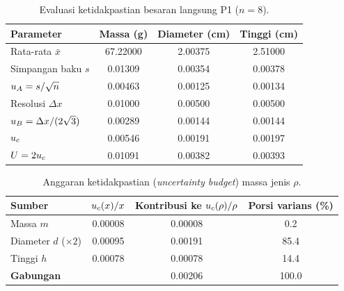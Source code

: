 \documentclass[a4paper, 12pt]{article}
\begin{document}
\begin{table}[H]
\centering
\singlespacing
\caption{Evaluasi ketidakpastian besaran langsung P1 ($n=8$).}
\label{tab:uP1}
\small
\begin{tabular}{l S[table-format=2.5] S[table-format=1.5] S[table-format=1.5]}
\toprule
\textbf{Parameter} & {Massa (g)} & {Diameter (cm)} & {Tinggi (cm)}\\
\midrule
Rata-rata $\bar{x}$ & 67.22000 & 2.00375 & 2.51000\\
Simpangan baku $s$ & 0.01309 & 0.00354 & 0.00378\\
$u_{A}=s/\sqrt{n}$ & 0.00463 & 0.00125 & 0.00134\\
Resolusi $\Delta x$ & 0.01000 & 0.00500 & 0.00500\\
$u_{B}=\Delta x/(2\sqrt{3})$ & 0.00289 & 0.00144 & 0.00144\\
$u_{c}$ & 0.00546 & 0.00191 & 0.00197\\
$U=2u_{c}$ & 0.01091 & 0.00382 & 0.00393\\
\bottomrule
\end{tabular}
\end{table}

\begin{table}[H]
\centering
\singlespacing
\caption{Anggaran ketidakpastian (\textit{uncertainty budget}) massa jenis $\rho$.}
\label{tab:budget}
\small
\begin{tabular}{l S[table-format=1.5] S[table-format=1.5] S[table-format=3.1]}
\toprule
\textbf{Sumber} & {$u_{c}(x)/x$} & {Kontribusi ke $u_{c}(\rho)/\rho$} & {Porsi varians (\%)}\\
\midrule
Massa $m$ & 0.00008 & 0.00008 & 0.2\\
Diameter $d$ ($\times2$) & 0.00095 & 0.00191 & 85.4\\
Tinggi $h$ & 0.00078 & 0.00078 & 14.4\\
\midrule
\textbf{Gabungan} & & 0.00206 & 100.0\\
\bottomrule
\end{tabular}
\end{table}
\end{document}
